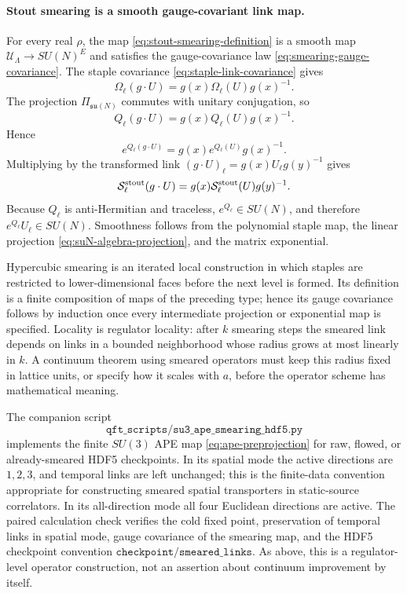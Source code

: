 \paragraph{Stout smearing is a smooth gauge-covariant link map.}
For every real \(\rho\), the map
\eqref{eq:stout-smearing-definition} is a smooth map
\(\mathcal U_\Lambda\to SU(N)^E\) and satisfies the gauge-covariance law
\eqref{eq:smearing-gauge-covariance}.
The staple covariance \eqref{eq:staple-link-covariance} gives
\[
  \Omega_\ell(g\cdot U)
  =
  g(x)\Omega_\ell(U)g(x)^{-1}.
\]
The projection \(\Pi_{\mathfrak{su}(N)}\) commutes with unitary conjugation,
so
\[
  Q_\ell(g\cdot U)=g(x)Q_\ell(U)g(x)^{-1}.
\]
Hence
\[
  e^{Q_\ell(g\cdot U)}
  =
  g(x)e^{Q_\ell(U)}g(x)^{-1}.
\]
Multiplying by the transformed link
\((g\cdot U)_\ell=g(x)U_\ell g(y)^{-1}\) gives
\[
  \mathcal S_\ell^{\rm stout}(g\cdot U)
  =
  g(x)\mathcal S_\ell^{\rm stout}(U)g(y)^{-1}.
\]
Because \(Q_\ell\) is anti-Hermitian and traceless, \(e^{Q_\ell}\in SU(N)\),
and therefore \(e^{Q_\ell}U_\ell\in SU(N)\).  Smoothness follows from the
polynomial staple map, the linear projection
\eqref{eq:suN-algebra-projection}, and the matrix exponential.

Hypercubic smearing is an iterated local construction in which staples are
restricted to lower-dimensional faces before the next level is formed.  Its
definition is a finite composition of maps of the preceding type; hence its
gauge covariance follows by induction once every intermediate projection or
exponential map is specified.  Locality is regulator locality: after \(k\)
smearing steps the smeared link depends on links in a bounded neighborhood
whose radius grows at most linearly in \(k\).  A continuum theorem using
smeared operators must keep this radius fixed in lattice units, or specify
how it scales with \(a\), before the operator scheme has mathematical
meaning.

The companion script
\[
  \texttt{qft\_scripts/su3\_ape\_smearing\_hdf5.py}
\]
implements the finite \(SU(3)\) APE map \eqref{eq:ape-preprojection} for raw,
flowed, or already-smeared HDF5 checkpoints.  In its spatial mode the active
directions are \(1,2,3\), and temporal links are left unchanged; this is the
finite-data convention appropriate for constructing smeared spatial
transporters in static-source correlators.  In its all-direction mode all
four Euclidean directions are active.  The paired calculation check verifies
the cold fixed point, preservation of temporal links in spatial mode, gauge
covariance of the smearing map, and the HDF5 checkpoint convention
\(\texttt{checkpoint/smeared\_links}\).  As above, this is a regulator-level
operator construction, not an assertion about continuum improvement by
itself.

